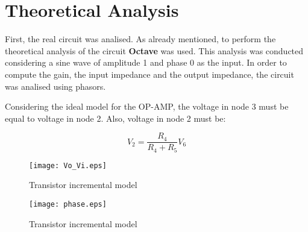\newpage
\section{Theoretical Analysis}
\label{sec:analysis}



First, the real circuit was analised. As already mentioned, to perform the theoretical analysis of the circuit {\bf Octave} was used. This analysis was conducted considering a sine wave of amplitude 1 and phase 0 as the input. In order to compute the gain, the input impedance and the output impedance, the circuit was analised using phasors.

Considering the ideal model for the OP-AMP, the voltage in node 3 must be equal to voltage in node 2. Also, voltage in node 2 must be:

\begin{equation}
        V_2 = \frac{R_4}{R_4+R_5}V_6
\end{equation}

\begin{figure}[H]
        \centering
        \texttt{[image: Vo\_Vi.eps]}
        \caption{Transistor incremental model}
        \label{transistorinc}
\end{figure}

\begin{figure}[H]
        \centering
        \texttt{[image: phase.eps]}
        \caption{Transistor incremental model}
        \label{transistorinc}
\end{figure}
